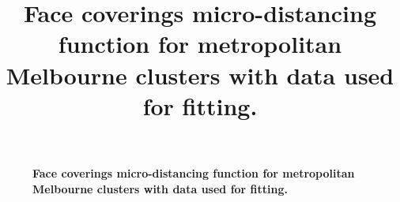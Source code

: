 \begin{figure}[ht]
    \caption{\textbf{Face coverings micro-distancing function for metropolitan Melbourne clusters with data used for fitting.}}
	\label{fig:face}
	\title{Face coverings micro-distancing function for metropolitan Melbourne clusters with data used for fitting.}
\end{figure}
